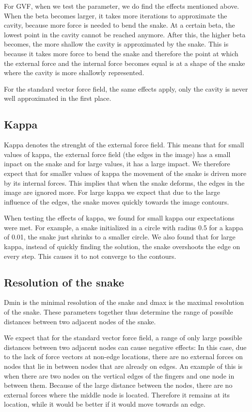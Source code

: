 \documentclass{article}
\begin{document}
For GVF, when we test the parameter, we do find the effects mentioned above. When the beta becomes larger, it takes more iterations to approximate the cavity, because more force is needed to bend the snake. At a certain beta, the lowest point in the cavity cannot be reached anymore. After this, the higher beta becomes, the more shallow the cavity is approximated by the snake. This is because it takes more force to bend the snake and therefore the point at which the external force and the internal force becomes equal is at a shape of the snake where the cavity is more shallowly represented. 

For the standard vector force field, the same effects apply, only the cavity is never well approximated in the first place. 

\subsection{Kappa}
Kappa denotes the strenght of the external force field. This means that for small values of kappa, the external force field (the edges in the image) has a small inpact on the snake and for large values, it has a large impact. We therefore expect that for smaller values of kappa the movement of the snake is driven more by its internal forces. This implies that when the snake deforms, the edges in the image are ignored more. For large kappa we expect that due to the large influence of the edges, the snake moves quickly towards the image contours.

When testing the effects of kappa, we found for small kappa our expectations were met. For example, a snake initialized in a circle with radius 0.5 for a kappa of 0.01, the snake just shrinks to a smaller circle. 
We also found that for large kappa, instead of quickly finding the solution, the snake overshoots the edge on every step. This causes it to not converge to the contours. 

\subsection{Resolution of the snake}
Dmin is the minimal resolution of the snake and dmax is the maximal resolution of the snake. These parameters together thus determine the range of possible distances between two adjacent nodes of the snake.

We expect that for the standard vector force field, a range of only large possible distances between two adjacent nodes can cause negative effects: In this case, due to the lack of force vectors at non-edge locations, there are no external forces on nodes that lie in between nodes that are already on edges. An example of this is when there are two nodes on the vertical edges of the fingers and one node in between them. Because of the large distance between the nodes, there are no external forces where the middle node is located. Therefore it remains at its location, while it would be better if it would move towards an edge. 
\end{document}
